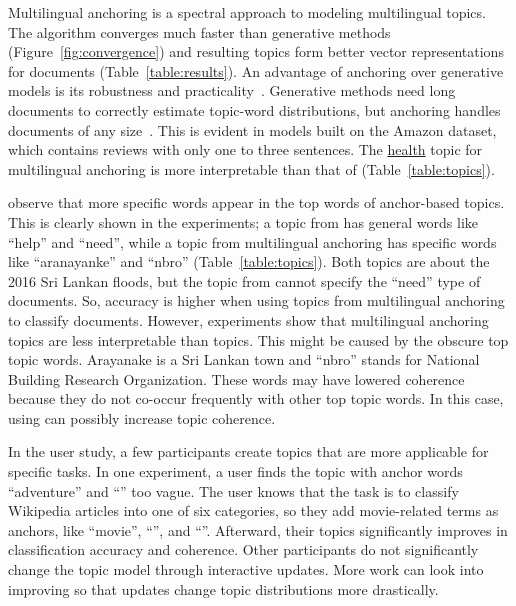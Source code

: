 Multilingual anchoring is a spectral approach to modeling multilingual topics.  The algorithm converges much faster than generative methods (Figure~\ref{fig:convergence}) and resulting topics form better vector representations for documents (Table~\ref{table:results}).  An advantage of anchoring over generative models is its robustness and practicality~\citep{arora-2013}.  Generative methods need long documents to correctly estimate topic-word distributions, but anchoring handles documents of any size~\citep{arora-2012-anchor}.  This is evident in models built on the Amazon dataset, which contains reviews with only one to three sentences.  The \underline{health} topic for multilingual anchoring is more interpretable than that of  (Table~\ref{table:topics}). 

 observe that more specific words appear in the top words of anchor-based topics.   This is clearly shown in the  experiments; a topic from  has general words like ``help'' and ``need'', while a topic from multilingual anchoring has specific words like ``aranayanke'' and ``nbro'' (Table~\ref{table:topics}).  Both topics are about the 2016 Sri Lankan floods, but the topic from  cannot specify the ``need'' type of documents.  So, accuracy is higher when using topics from multilingual anchoring to classify documents.  However,  experiments show that multilingual anchoring topics are less interpretable than  topics.  This might be caused by the obscure top topic words.  Arayanake is a Sri Lankan town and ``nbro'' stands for National Building Research Organization.  These words may have lowered coherence because they do not co-occur frequently with other top topic words. In this case, using \mtanchor can possibly increase topic coherence.

In the user study, a few participants create topics that are more applicable for specific tasks.  In one experiment, a user finds the topic with anchor words ``adventure'' and ``'' too vague.  The user knows that the task is to classify Wikipedia articles into one of six categories, so they add movie-related terms as anchors, like ``movie'', ``'', and ``''.  Afterward, their topics significantly improves in classification accuracy and coherence.  Other participants do not significantly change the topic model through interactive updates.  More work can look into improving \mtanchor so that updates change topic distributions more drastically.   

